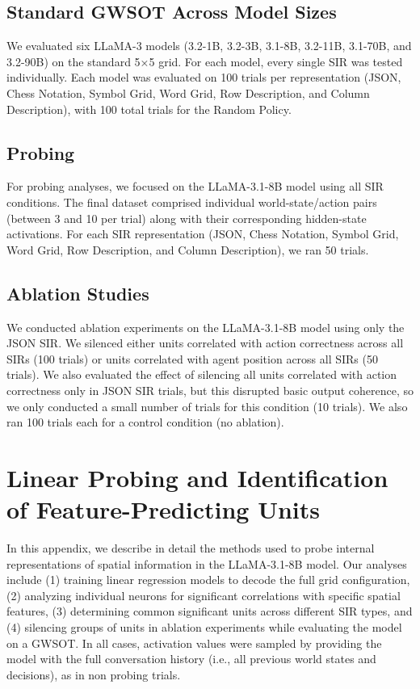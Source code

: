 \documentclass[runningheads]{llncs}
\begin{document}
\subsection{Standard GWSOT Across Model Sizes}
We evaluated six LLaMA-3 models (3.2-1B, 3.2-3B, 3.1-8B, 3.2-11B, 3.1-70B, and 3.2-90B) on the standard 5×5 grid. For each model, every single SIR was tested individually. Each model was evaluated on 100 trials per representation (JSON, Chess Notation, Symbol Grid, Word Grid, Row Description, and Column Description), with 100 total trials for the Random Policy.

\subsection{Probing}
For probing analyses, we focused on the LLaMA-3.1-8B model using all SIR conditions. The final dataset comprised individual world-state/action pairs (between 3 and 10 per trial) along with their corresponding hidden-state activations. For each SIR representation (JSON, Chess Notation, Symbol Grid, Word Grid, Row Description, and Column Description), we ran 50 trials.

\subsection{Ablation Studies}
We conducted ablation experiments on the LLaMA-3.1-8B model using only the JSON SIR. We silenced either units correlated with action correctness across all SIRs (100 trials) or units correlated with agent position across all SIRs (50 trials). We also evaluated the effect of silencing all units correlated with action correctness only in JSON SIR trials, but this disrupted basic output coherence, so we only conducted a small number of trials for this condition (10 trials). We also ran 100 trials each for a control condition (no ablation).


\section{Linear Probing and Identification of Feature-Predicting Units}

In this appendix, we describe in detail the methods used to probe internal representations of spatial information in the LLaMA-3.1-8B model. Our analyses include (1) training linear regression models to decode the full grid configuration, (2) analyzing individual neurons for significant correlations with specific spatial features, (3) determining common significant units across different SIR types, and (4) silencing groups of units in ablation experiments while evaluating the model on a GWSOT. In all cases, activation values were sampled by providing the model with the full conversation history (i.e., all previous world states and decisions), as in non probing trials.
\end{document}
